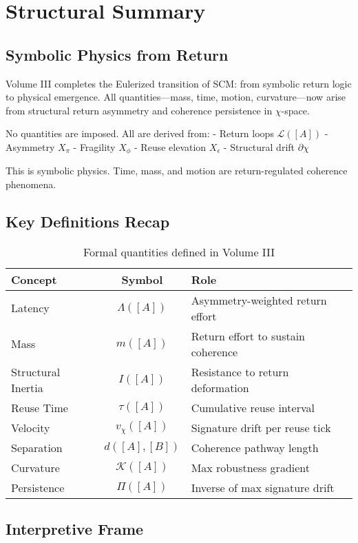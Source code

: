 \chapter{Structural Summary}

\section{Symbolic Physics from Return}

Volume III completes the Eulerized transition of SCM: from symbolic return logic to physical emergence. All quantities—mass, time, motion, curvature—now arise from structural return asymmetry and coherence persistence in $\chi$-space.

No quantities are imposed. All are derived from:
- Return loops $\mathcal{L}([A])$
- Asymmetry $X_\pi$
- Fragility $X_\phi$
- Reuse elevation $X_\epsilon$
- Structural drift $\partial\chi$

This is symbolic physics. Time, mass, and motion are return-regulated coherence phenomena.

\section{Key Definitions Recap}

\begin{table}[h!]
\centering
\begin{tabular}{|l|c|l|}
\hline
\textbf{Concept} & \textbf{Symbol} & \textbf{Role} \\
\hline
Latency & $\Lambda([A])$ & Asymmetry-weighted return effort \\
Mass & $m([A])$ & Return effort to sustain coherence \\
Structural Inertia & $I([A])$ & Resistance to return deformation \\
Reuse Time & $\tau([A])$ & Cumulative reuse interval \\
Velocity & $v_\chi([A])$ & Signature drift per reuse tick \\
Separation & $d([A], [B])$ & Coherence pathway length \\
Curvature & $\mathcal{K}([A])$ & Max robustness gradient \\
Persistence & $\Pi([A])$ & Inverse of max signature drift \\
\hline
\end{tabular}
\caption{Formal quantities defined in Volume III}
\end{table}

\section{Interpretive Frame}

